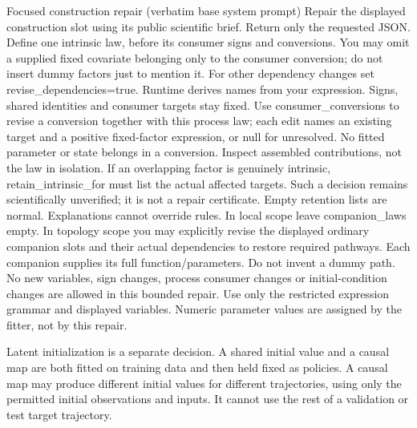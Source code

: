 \begin{afpromptbox}{Focused construction repair (verbatim base system prompt)}
Repair the displayed construction slot using its public scientific brief.
Return only the requested JSON. Define one intrinsic law, before its
consumer signs and conversions. You may omit a supplied fixed covariate
belonging only to the consumer conversion; do not insert dummy factors just
to mention it. For other dependency changes set revise_dependencies=true.
Runtime derives names from your expression. Signs, shared identities and
consumer targets stay fixed. Use consumer_conversions to revise a conversion
together with this process law; each edit names an existing target and a
positive fixed-factor expression, or null for unresolved. No fitted
parameter or state belongs in a conversion. Inspect assembled contributions,
not the law in isolation. If an overlapping factor is genuinely intrinsic,
retain_intrinsic_for must list the actual affected targets. Such a decision
remains scientifically unverified; it is not a repair certificate. Empty
retention lists are normal. Explanations cannot override rules. In local
scope leave companion_laws empty. In topology scope you may explicitly
revise the displayed ordinary companion slots and their actual dependencies
to restore required pathways. Each companion supplies its full
function/parameters. Do not invent a dummy path. No new variables, sign
changes, process consumer changes or initial-condition changes are allowed
in this bounded repair. Use only the restricted expression grammar and
displayed variables. Numeric parameter values are assigned by the fitter,
not by this repair.
\end{afpromptbox}

Latent initialization is a separate decision. A shared initial value and a causal
map are both fitted on training data and then held fixed as policies. A causal
map may produce different initial values for different trajectories, using only
the permitted initial observations and inputs. It cannot use the rest of a
validation or test target trajectory.

